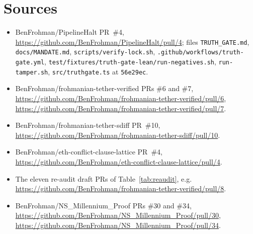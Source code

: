 \documentclass[11pt,a4paper]{article}
\newcommand{\code}[1]{\texttt{#1}}
\begin{document}
\section*{Sources}
\small
\begin{itemize}
\item BenFrohman/PipelineHalt PR~\#4, \url{https://github.com/BenFrohman/PipelineHalt/pull/4};
  files \code{TRUTH\_GATE.md}, \code{docs/MANDATE.md}, \code{scripts/verify-lock.sh},
  \code{.github/workflows/truth-gate.yml}, \code{test/fixtures/truth-gate-lean/run-negatives.sh},
  \code{run-tamper.sh}, \code{src/truthgate.ts} at \code{56e29ec}.
\item BenFrohman/frohmanian-tether-verified PRs \#6 and \#7,
  \url{https://github.com/BenFrohman/frohmanian-tether-verified/pull/6},
  \url{https://github.com/BenFrohman/frohmanian-tether-verified/pull/7}.
\item BenFrohman/frohmanian-tether-sdiff PR~\#10,
  \url{https://github.com/BenFrohman/frohmanian-tether-sdiff/pull/10}.
\item BenFrohman/eth-conflict-clause-lattice PR~\#4,
  \url{https://github.com/BenFrohman/eth-conflict-clause-lattice/pull/4}.
\item The eleven re-audit draft PRs of Table~\ref{tab:reaudit}, e.g.
  \url{https://github.com/BenFrohman/frohmanian-tether-verified/pull/8}.
\item BenFrohman/NS\_Millennium\_Proof PRs \#30 and \#34,
  \url{https://github.com/BenFrohman/NS_Millennium_Proof/pull/30},
  \url{https://github.com/BenFrohman/NS_Millennium_Proof/pull/34}.
\end{itemize}
\end{document}
